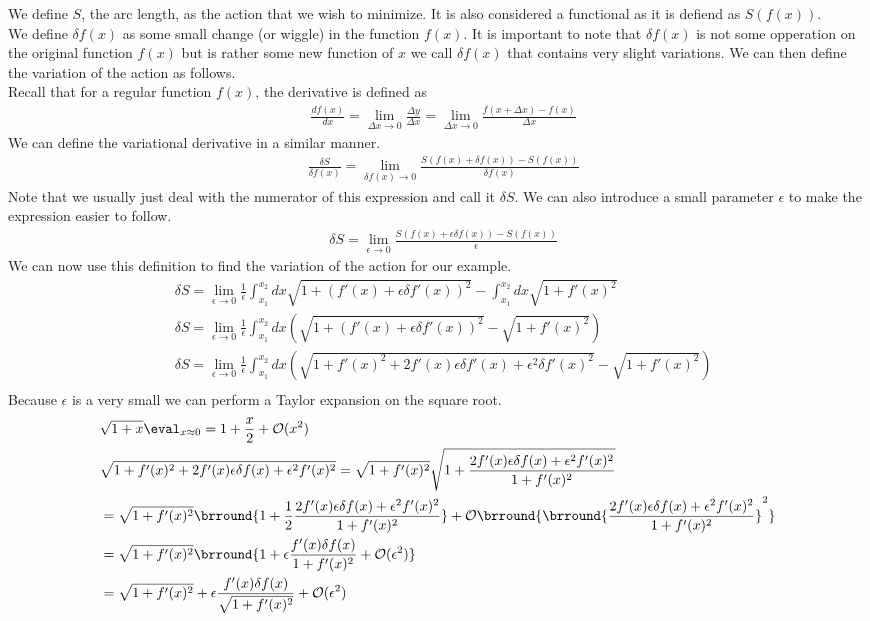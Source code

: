 We define $S$, the arc length, as the action that we wish to minimize. It is also considered a functional as it is defiend as $S(f(x))$.\\
We define $\delta f(x)$ as some small change (or wiggle) in the function $f(x)$. It is important to note that $\delta f(x)$ is not some opperation on the original function $f(x)$ but is rather some new function of $x$ we call $\delta f(x)$ that contains very slight variations. We can then define the variation of the action as follows.\\
Recall that for a regular function $f(x)$, the derivative is defined as
\begin{align*}
    &\frac{df(x)}{dx}=\lim_{\Delta x\to0}\frac{\Delta y}{\Delta x}=\lim_{\Delta x\to0}\frac{f(x+\Delta x)-f(x)}{\Delta x}
\end{align*}
We can define the variational derivative in a similar manner.
\begin{align*}
    &\frac{\delta S}{\delta f(x)}=\lim_{\delta f(x)\to0}\frac{S(f(x)+\delta f(x))-S(f(x))}{\delta f(x)}
\end{align*}
Note that we usually just deal with the numerator of this expression and call it $\delta S$. We can also introduce a small parameter $\epsilon$ to make the expression easier to follow.
\begin{align*}
    &\delta S=\lim_{\epsilon\to0} \frac{S(f(x)+\epsilon\delta f(x))-S(f(x))}{\epsilon}
\end{align*}
We can now use this definition to find the variation of the action for our example.
\begin{align*}
    &\delta S=\lim_{\epsilon\to0} \frac{1}{\epsilon}\int_{x_1}^{x_2}dx\sqrt{1+(f'(x)+\epsilon\delta f'(x))^2}-\int_{x_1}^{x_2}dx\sqrt{1+f'(x)^2}\\
    &\delta S=\lim_{\epsilon\to0} \frac{1}{\epsilon}\int_{x_1}^{x_2}dx\left(\sqrt{1+(f'(x)+\epsilon\delta f'(x))^2}-\sqrt{1+f'(x)^2}\right)\\
    &\delta S=\lim_{\epsilon\to0} \frac{1}{\epsilon}\int_{x_1}^{x_2}dx\left(\sqrt{1+f'(x)^2+2f'(x)\epsilon\delta f'(x)+\epsilon^2\delta f'(x)^2}-\sqrt{1+f'(x)^2}\right)\\
\end{align*}
Because $\epsilon$ is a very small we can perform a Taylor expansion on the square root.
\begin{align*}
    &\sqrt{1+x}\eval_{x\approx0}=1+\frac{x}{2}+\mathcal{O}(x^2)\\
    &\sqrt{1+f'(x)^2+2f'(x)\epsilon \delta f(x)+\epsilon^2f'(x)^2}=\sqrt{1+f'(x)^2}\sqrt{1+\frac{2f'(x)\epsilon \delta f(x)+\epsilon^2f'(x)^2}{1+f'(x)^2}}\\
    &=\sqrt{1+f'(x)^2}\brround{1+\frac{1}{2}\frac{2f'(x)\epsilon \delta f(x)+\epsilon^2f'(x)^2}{1+f'(x)^2}}+\mathcal{O}\brround{\brround{\frac{2f'(x)\epsilon \delta f(x)+\epsilon^2f'(x)^2}{1+f'(x)^2}}^2}\\
    &=\sqrt{1+f'(x)^2}\brround{1+\epsilon\frac{f'(x)\delta f(x)}{1+f'(x)^2}+\mathcal{O}(\epsilon^2)}\\
    &=\sqrt{1+f'(x)^2}+\epsilon\frac{f'(x)\delta f(x)}{\sqrt{1+f'(x)^2}}+\mathcal{O}(\epsilon^2)
\end{align*}

